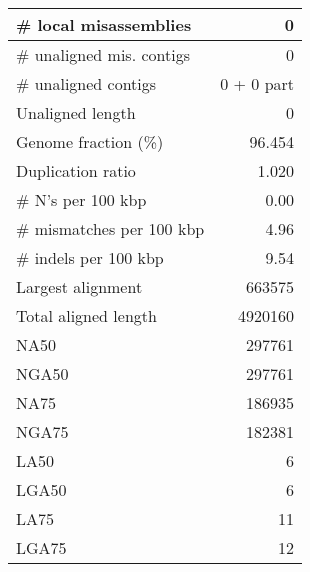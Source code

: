 \documentclass[12pt,a4paper]{article}
\begin{document}
\begin{table}[ht]
\begin{center}
\begin{tabular}{|l*{1}{|r}|}
\# local misassemblies & 0 \\ \hline
\# unaligned mis. contigs & 0 \\ \hline
\# unaligned contigs & 0 + 0 part \\ \hline
Unaligned length & 0 \\ \hline
Genome fraction (\%) & 96.454 \\ \hline
Duplication ratio & 1.020 \\ \hline
\# N's per 100 kbp & 0.00 \\ \hline
\# mismatches per 100 kbp & 4.96 \\ \hline
\# indels per 100 kbp & 9.54 \\ \hline
Largest alignment & 663575 \\ \hline
Total aligned length & 4920160 \\ \hline
NA50 & 297761 \\ \hline
NGA50 & 297761 \\ \hline
NA75 & 186935 \\ \hline
NGA75 & 182381 \\ \hline
LA50 & 6 \\ \hline
LGA50 & 6 \\ \hline
LA75 & 11 \\ \hline
LGA75 & 12 \\ \hline
\end{tabular}
\end{center}
\end{table}
\end{document}
